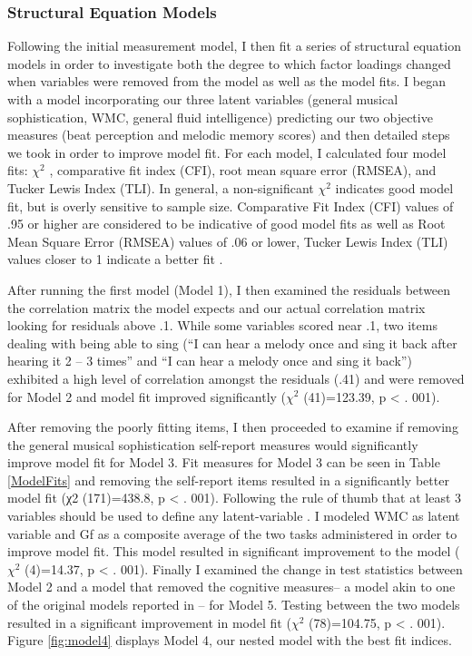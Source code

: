 \documentclass[12pt,]{book}
\begin{document}
\hypertarget{structural-equation-models}{%
\subsubsection{Structural Equation Models}\label{structural-equation-models}}

Following the initial measurement model, I then fit a series of structural equation models in order to investigate both the degree to which factor loadings changed when variables were removed from the model as well as the model fits.
I began with a model incorporating our three latent variables (general musical sophistication, WMC, general fluid intelligence) predicting our two objective measures (beat perception and melodic memory scores) and then detailed steps we took in order to improve model fit.
For each model, I calculated four model fits: \(\chi^2\) , comparative fit index (CFI), root mean square error (RMSEA), and Tucker Lewis Index (TLI).
In general, a non-significant \(\chi^2\) indicates good model fit, but is overly sensitive to sample size.
Comparative Fit Index (CFI) values of .95 or higher are considered to be indicative of good model fits as well as Root Mean Square Error (RMSEA) values of .06 or lower, Tucker Lewis Index (TLI) values closer to 1 indicate a better fit \citep{beaujeanLatentVariableModeling2014}.

After running the first model (Model 1), I then examined the residuals between the correlation matrix the model expects and our actual correlation matrix looking for residuals above .1.
While some variables scored near .1, two items dealing with being able to sing (``I can hear a melody once and sing it back after hearing it 2 -- 3 times'' and ``I can hear a melody once and sing it back'') exhibited a high level of correlation amongst the residuals (.41) and were removed for Model 2 and model fit improved significantly (\(\chi^2\) (41)=123.39, p \textless{} . 001).

After removing the poorly fitting items, I then proceeded to examine if removing the general musical sophistication self-report measures would significantly improve model fit for Model 3.
Fit measures for Model 3 can be seen in Table \ref{ModelFits} and removing the self-report items resulted in a significantly better model fit (χ2 (171)=438.8, p \textless{} . 001).
Following the rule of thumb that at least 3 variables should be used to define any latent-variable \citep{beaujeanLatentVariableModeling2014}.
I modeled WMC as latent variable and Gf as a composite average of the two tasks administered in order to improve model fit.
This model resulted in significant improvement to the model (\(\chi^2\) (4)=14.37, p \textless{} . 001).
Finally I examined the change in test statistics between Model 2 and a model that removed the cognitive measures-- a model akin to one of the original models reported in \citep{mullensiefenMusicalityNonMusiciansIndex2014}-- for Model 5.
Testing between the two models resulted in a significant improvement in model fit (\(\chi^2\) (78)=104.75, p \textless{} . 001).
Figure \ref{fig:model4} displays Model 4, our nested model with the best fit indices.
\end{document}
